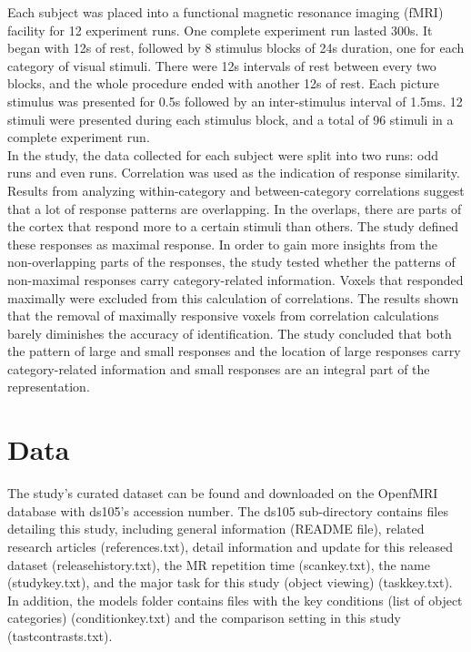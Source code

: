 \documentclass[11pt,twocolumn]{article}
\begin{document}
Each subject was placed into a functional magnetic resonance imaging 
(fMRI) facility for 12 experiment runs. One complete experiment run lasted 300s.
It began with 12s of rest, followed by 8 stimulus blocks of 24s duration, 
one for each category of visual stimuli. There were 12s intervals of 
rest between every two blocks, and the whole procedure ended 
with another 12s of rest. Each picture stimulus was presented
for 0.5s followed by an inter-stimulus interval of 1.5ms. 
12 stimuli were presented during each stimulus 
block, and a total of 96 stimuli in a complete experiment run.\\

In the study, the data collected for each subject were split into two 
runs: odd runs and even runs. Correlation was used as the indication of 
response similarity. Results from analyzing within-category and 
between-category correlations suggest that a lot of response patterns 
are overlapping. In the overlaps, there are parts of the cortex that respond 
more to a certain stimuli than others. The study defined these responses as 
maximal response. In order to gain more insights from the non-overlapping 
parts of the responses, the study tested whether the patterns of non-maximal 
responses carry category-related information. Voxels that responded maximally 
were excluded from this calculation of correlations. The results shown
that the removal of maximally responsive voxels from correlation calculations 
barely diminishes the accuracy of identification. The study concluded 
that both the pattern of large and small responses and the location 
of large responses carry category-related information and small responses
are an integral part of the representation.\\

\section{Data}

The study's curated dataset can be found and downloaded on the OpenfMRI 
database with ds105's accession number. The ds105 
sub-directory contains files detailing this study, including general information 
(README file), related research articles (references.txt), detail information 
and update for this released dataset (release\textunderscore history.txt), 
the MR repetition time (scan\textunderscore key.txt), the name 
(study\textunderscore key.txt), and the major task for this study 
(object viewing) (task\textunderscore key.txt). In addition, the models folder 
contains files with the key conditions (list of object categories) 
(condition\textunderscore key.txt) and the comparison setting in this study 
(tast\textunderscore contrasts.txt). \\
\end{document}
